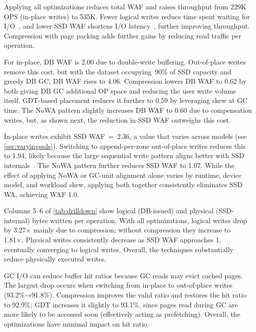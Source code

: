 Applying all optimizations reduces total WAF and raises throughput from 229K OPS (in-place writes) to 535K.
Fewer logical writes reduce time spent waiting for I/O~\cite{DBLP:journals/pvldb/LeeAL23,DBLP:journals/pacmmod/WangQYZ25}, 
and lower SSD WAF shortens I/O latency~\cite{ssdiq}, further improving throughput.
Compression with page packing adds further gains by reducing read traffic per operation.

For in-place, DB WAF is 2.00 due to double-write buffering.
Out-of-place writes remove this cost, but with the dataset occupying~90\% of SSD capacity and greedy DB GC, DB WAF rises to 4.06.
Compression lowers DB WAF to 0.62 by both giving DB GC additional OP space and reducing the user write volume itself.
GDT-based placement reduces it further to 0.59 by leveraging skew at GC time.
The NoWA pattern slightly increases DB WAF to 0.60 due to compensation writes, but, as shown next, the reduction in SSD WAF outweighs this cost.

In-place writes exhibit SSD WAF~=~2.36, a value that varies across models (see \cref{sec:varyingssds}).
Switching to append-per-zone out-of-place writes reduces this to 1.94, likely because the large sequential write pattern aligns better with SSD internals~\cite{DBLP:conf/fast/MinKCLE12}.
The NoWA pattern further reduces SSD WAF to 1.07.  
While the effect of applying NoWA or GC-unit alignment alone varies by runtime, device model, and workload skew, applying both together consistently eliminates SSD WA, achieving WAF 1.0.

Columns 5--6 of \cref{tab:drilldown} show logical (DB-issued) and physical (SSD-internal) bytes written per operation.
With all optimizations, logical writes drop by 3.27× mainly due to compression; without compression they increase to 1.81×.
Physical writes consistently decrease as SSD WAF approaches 1, eventually converging to logical writes.
Overall, the techniques substantially reduce physically executed writes.

GC I/O can reduce buffer hit ratios because GC reads may evict cached pages.
The largest drop occurs when switching from in-place to out-of-place writes (93.2\%→91.8\%).
Compression improves the valid ratio and restores the hit ratio to 92.9\%; GDT increases it slightly to 93.1\%, since pages read during GC are more likely to be accessed soon (effectively acting as prefetching).
Overall, the optimizations have minimal impact on hit ratio.

